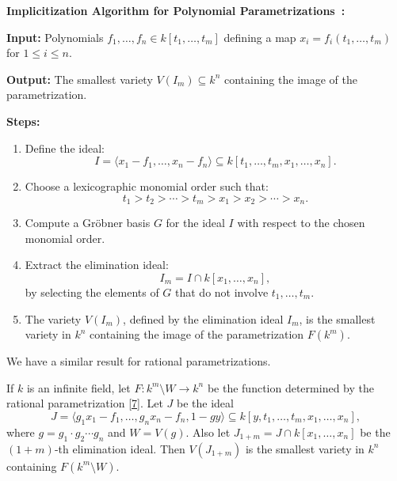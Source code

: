 \documentclass[12pt]{article}
\newcounter{algorithm}
\newenvironment{algorithm}[1][Algorithm]{%
    \refstepcounter{algorithm}%
    \noindent\textbf{\color{orange}#1~\thealgorithm:}%
}{}
\begin{document}
\begin{algorithm}[Implicitization Algorithm for Polynomial Parametrizations]

	\textbf{Input:} Polynomials \( f_1, \ldots, f_n \in k[t_1, \ldots, t_m] \) defining a map
	\( x_i = f_i(t_1, \ldots, t_m) \) for \( 1 \leq i \leq n \).

	\textbf{Output:} The smallest variety \( V(I_m) \subseteq k^n \) containing the image of the parametrization.

	\textbf{Steps:}
	\begin{enumerate}
		\item Define the ideal:
		      \[
			      I = \langle x_1 - f_1, \ldots, x_n - f_n \rangle \subseteq k[t_1, \ldots, t_m, x_1, \ldots, x_n].
		      \]

		\item Choose a lexicographic monomial order such that:
		      \[
			      t_1 > t_2 > \cdots > t_m > x_1 > x_2 > \cdots > x_n.
		      \]

		\item Compute a Gröbner basis \( G \) for the ideal \( I \) with respect to the chosen monomial order.

		\item Extract the elimination ideal:
		      \[
			      I_m = I \cap k[x_1, \ldots, x_n],
		      \]
		      by selecting the elements of \( G \) that do not involve \( t_1, \ldots, t_m \).

		\item The variety \( V(I_m) \), defined by the elimination ideal \( I_m \), is the smallest variety in \( k^n \) containing the image of the parametrization \( F(k^m) \).
	\end{enumerate}
\end{algorithm}

We have a similar result for rational parametrizations.

\begin{theorem}
	If \( k \) is an infinite field, let \( F : k^m \setminus W \to k^n \) be the function determined by the rational parametrization \eqref{7}. Let \( J \) be the ideal
	\[
		J = \langle g_1 x_1 - f_1, \dots, g_n x_n - f_n, 1 - g y \rangle \subseteq k[y, t_1, \dots, t_m, x_1, \dots, x_n],
	\]
	where \( g = g_1 \cdot g_2 \cdots g_n \) and \( W = V(g) \). Also let \( J_{1+m} = J \cap k[x_1, \dots, x_n] \) be the \((1+m)\)-th elimination ideal. Then \( V(J_{1+m}) \) is the smallest variety in \( k^n \) containing \( F(k^m \setminus W) \).
\end{theorem}
\end{document}
